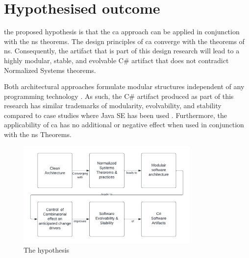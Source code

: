 \section{Hypothesised outcome} \label{hypothesis} 

the proposed hypothesis is that the \gls{ca} approach can be applied in conjunction with
the \gls{ns} theorems. The design principles of \gls{ca} converge with the theorems of
\gls{ns}. Consequently, the artifact that is part of this design research will lead to a
highly modular, stable, and evolvable C\# artifact that does not contradict Normalized
Systems theorems.

Both architectural approaches formulate modular structures independent of any programming
technology \parencite{mannaert_normalized_2009,robert_c_martin_clean_2018}. As such, the
C\# artifact produced as part of this research has similar trademarks of modularity,
evolvability, and stability compared to case studies where Java SE has been used
\parencite{oorts_building_2014, de_bruyn_enabling_2018}. Furthermore, the applicability of
\gls{ca} has no additional or negative effect when used in conjunction with the
\gls{ns} Theorems.

\begin{figure}[H]
    \centering
    \includegraphics[width=0.8\textwidth]{figures/hypothesis.pdf}
    \caption[The hypothesis]{The hypothesis}
    \label{fig_hypothesis}
\end{figure}